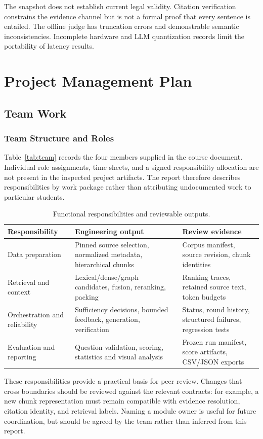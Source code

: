 \documentclass[11pt,a4paper,oneside]{report}
\begin{document}
The snapshot does not establish current legal validity. Citation verification constrains the evidence channel but is not a formal proof that every sentence is entailed. The offline judge has truncation errors and demonstrable semantic inconsistencies. Incomplete hardware and LLM quantization records limit the portability of latency results.

\chapter{Project Management Plan}
\section{Team Work}
\subsection{Team Structure and Roles}
Table~\ref{tab:team} records the four members supplied in the course document. Individual role assignments, time sheets, and a signed responsibility allocation are not present in the inspected project artifacts. The report therefore describes responsibilities by work package rather than attributing undocumented work to particular students.

\begin{table}[H]\centering\small
\caption{Functional responsibilities and reviewable outputs.}\label{tab:responsibilities}
\begin{tabularx}{\textwidth}{P{3cm}YY}\toprule
\textbf{Responsibility} & \textbf{Engineering output} & \textbf{Review evidence}\\\midrule
Data preparation & Pinned source selection, normalized metadata, hierarchical chunks & Corpus manifest, source revision, chunk identities\\
Retrieval and context & Lexical/dense/graph candidates, fusion, reranking, packing & Ranking traces, retained source text, token budgets\\
Orchestration and reliability & Sufficiency decisions, bounded feedback, generation, verification & Status, round history, structured failures, regression tests\\
Evaluation and reporting & Question validation, scoring, statistics and visual analysis & Frozen run manifest, score artifacts, CSV/JSON exports\\\bottomrule
\end{tabularx}
\end{table}
These responsibilities provide a practical basis for peer review. Changes that cross boundaries should be reviewed against the relevant contracts: for example, a new chunk representation must remain compatible with evidence resolution, citation identity, and retrieval labels. Naming a module owner is useful for future coordination, but should be agreed by the team rather than inferred from this report.
\end{document}
